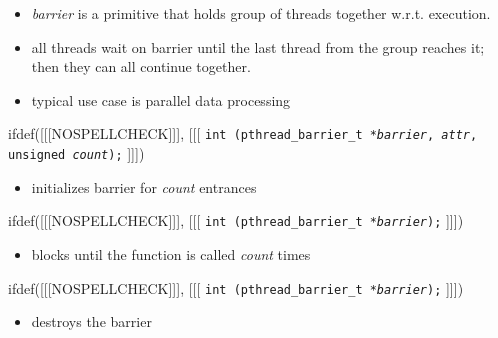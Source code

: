 \begin{slide}
\begin{itemize}
\item \emph{barrier} is a primitive that holds group of threads together
w.r.t. execution.
\item all threads wait on barrier until the last thread from the group
reaches it; then they can all continue together.
\item typical use case is parallel data processing
\end{itemize}
ifdef([[[NOSPELLCHECK]]], [[[
\texttt{int (pthread\_barrier\_t *\emph{barrier},
\emph{attr}, unsigned \emph{count});}
]]])
\begin{itemize}
\item initializes barrier for \emph{count} entrances
\end{itemize}
ifdef([[[NOSPELLCHECK]]], [[[
\texttt{int (pthread\_barrier\_t *\emph{barrier});}
]]])
\begin{itemize}
\item blocks until the function is called \emph{count} times
\end{itemize}
ifdef([[[NOSPELLCHECK]]], [[[
\texttt{int (pthread\_barrier\_t *\emph{barrier});}
]]])
\begin{itemize}
\item destroys the barrier
\end{itemize}
\end{slide}


